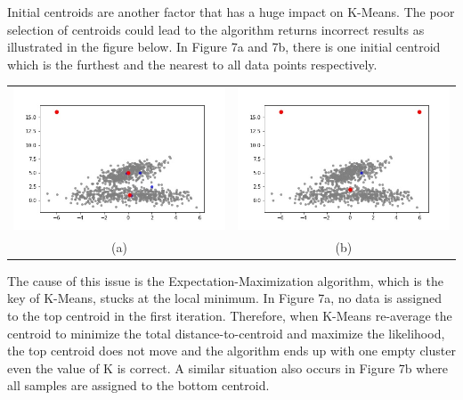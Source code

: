 \documentclass{article}
\begin{document}
Initial centroids are another factor that has a huge impact on K-Means. The poor selection of centroids could lead to the algorithm returns incorrect results as illustrated in the figure below. In Figure 7a and 7b, there is one initial centroid which is the furthest and the nearest to all data points respectively.\\

\begin{center}
\begin{tabular}{c c}
\includegraphics[scale=0.3]{one_furthest_centroid} &
\includegraphics[scale=0.3]{one_nearest_centroid} \\
\scriptsize (a) & \scriptsize (b)
\end{tabular}
\end{center}

The cause of this issue is the Expectation-Maximization algorithm, which is the key of K-Means, stucks at the local minimum. In Figure 7a, no data is assigned to the top centroid in the first iteration. Therefore, when K-Means re-average the centroid to minimize the total distance-to-centroid and maximize the likelihood, the top centroid does not move and the algorithm ends up with one empty cluster even the value of K is correct. A similar situation also occurs in Figure 7b where all samples are assigned to the bottom centroid.
\end{document}
